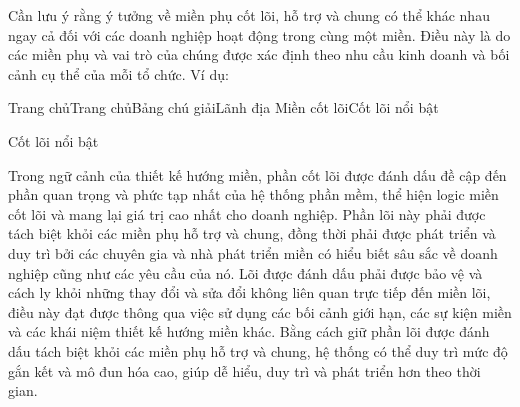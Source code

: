 


Cần lưu ý rằng ý tưởng về miền phụ cốt lõi, hỗ trợ và chung có thể khác nhau ngay cả đối với các doanh nghiệp hoạt động trong cùng một miền. Điều này là do các miền phụ và vai trò của chúng được xác định theo nhu cầu kinh doanh và bối cảnh cụ thể của mỗi tổ chức. Ví dụ:



Trang chủTrang chủBảng chú giảiLãnh địa Miền cốt lõiCốt lõi nổi bật

Cốt lõi nổi bật

Trong ngữ cảnh của thiết kế hướng miền, phần cốt lõi được đánh dấu đề cập đến phần quan trọng và phức tạp nhất của hệ thống phần mềm, thể hiện logic miền cốt lõi và mang lại giá trị cao nhất cho doanh nghiệp. Phần lõi này phải được tách biệt khỏi các miền phụ hỗ trợ và chung, đồng thời phải được phát triển và duy trì bởi các chuyên gia và nhà phát triển miền có hiểu biết sâu sắc về doanh nghiệp cũng như các yêu cầu của nó. Lõi được đánh dấu phải được bảo vệ và cách ly khỏi những thay đổi và sửa đổi không liên quan trực tiếp đến miền lõi, điều này đạt được thông qua việc sử dụng các bối cảnh giới hạn, các sự kiện miền và các khái niệm thiết kế hướng miền khác. Bằng cách giữ phần lõi được đánh dấu tách biệt khỏi các miền phụ hỗ trợ và chung, hệ thống có thể duy trì mức độ gắn kết và mô đun hóa cao, giúp dễ hiểu, duy trì và phát triển hơn theo thời gian.





